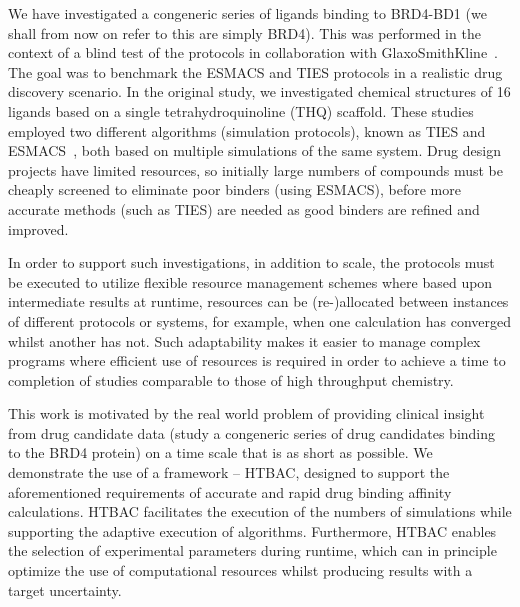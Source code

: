 \documentclass[conference]{IEEEtran}
\begin{document}
We have investigated a congeneric series of ligands binding to BRD4-BD1 (we shall
from now on refer to this are simply BRD4). This was performed in the context
of a blind test of the protocols in collaboration with
GlaxoSmithKline~\cite{Wan2017brd4}. The goal was to benchmark the ESMACS and
TIES protocols in a realistic drug discovery scenario. In the original study,
we investigated chemical structures of 16 ligands based on a single
tetrahydroquinoline (THQ) scaffold. These studies employed two different
algorithms (simulation protocols), known as TIES and ESMACS~\cite{Bhati2017},
both based on multiple simulations of the same system. Drug design projects
have limited resources, so initially large numbers of compounds must be
cheaply screened to eliminate poor binders (using ESMACS), before more
accurate methods (such as TIES) are needed as good binders are refined and
improved.

In order to support such investigations, in addition to scale, the protocols
must be executed to utilize  flexible resource management schemes where based
upon intermediate results at runtime, resources can be (re-)allocated between
instances of different protocols or systems, for example, when one calculation
has converged whilst another has not. Such adaptability makes it easier to
manage complex programs where efficient use of resources is required in order
to achieve a time to completion of studies comparable to those of high
throughput chemistry.

This work is motivated by the real world problem of providing clinical insight
from drug candidate data (study a congeneric series of drug candidates binding
to the BRD4 protein) on a time scale that is as short as possible. We 
demonstrate the use of a framework -- HTBAC, designed to
support the aforementioned requirements of accurate and rapid drug binding
affinity calculations. HTBAC facilitates the execution of the numbers of
simulations while supporting the adaptive execution of algorithms.
Furthermore, HTBAC enables the selection of experimental parameters during
runtime, which can in principle optimize the use of computational resources
whilst producing results with a target uncertainty.


\end{document}
